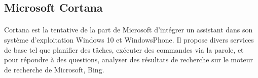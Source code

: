 \subsection{Microsoft Cortana}
\paragraph{}
Cortana est la tentative de la part de Microsoft d'intégrer un assistant dans son système d'exploitation Windows 10 et WindowsPhone. Il propose divers services de base tel que planifier des tâches, exécuter des commandes via la parole, et  pour répondre à des questions, analyser des résultats de recherche sur le moteur de recherche de Microsoft, Bing.
%


